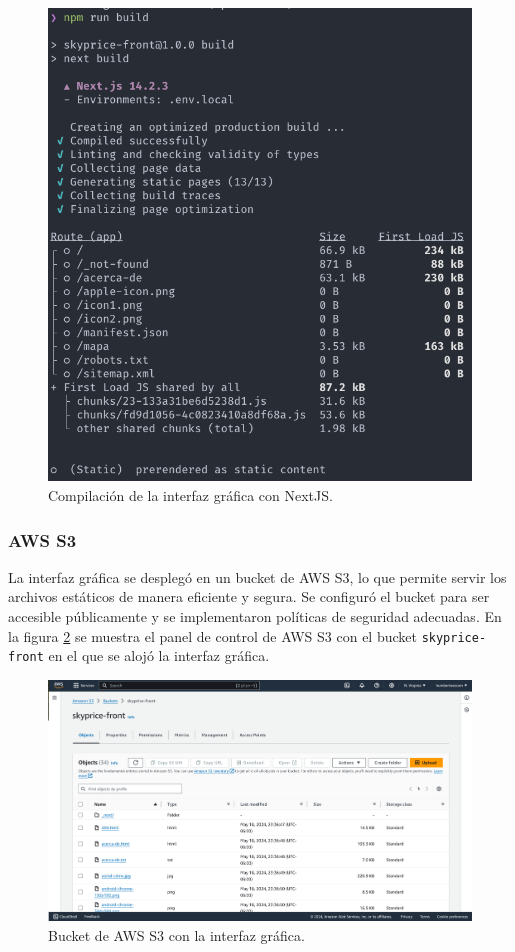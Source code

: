 \begin{figure}[H]
    \centering
    \includegraphics[width=1.0\textwidth]{imagenes/05-implementacion/despliegue/npm-build.png}
    \caption{Compilación de la interfaz gráfica con NextJS.}
    \label{fig:next-build}
\end{figure}

\subsubsection{AWS S3}
La interfaz gráfica se desplegó en un bucket de AWS S3, lo que permite servir los
archivos estáticos de manera eficiente y segura. Se configuró el bucket para ser
accesible públicamente y se implementaron políticas de seguridad adecuadas. En
la figura \ref{fig:aws-s3} se muestra el panel de control de AWS S3 con el bucket
\texttt{skyprice-front} en el que se alojó la interfaz gráfica.

\begin{figure}[H]
    \centering
    \includegraphics[width=1.0\textwidth]{imagenes/05-implementacion/despliegue/aws-s3.png}
    \caption{Bucket de AWS S3 con la interfaz gráfica.}
    \label{fig:aws-s3}
\end{figure}

